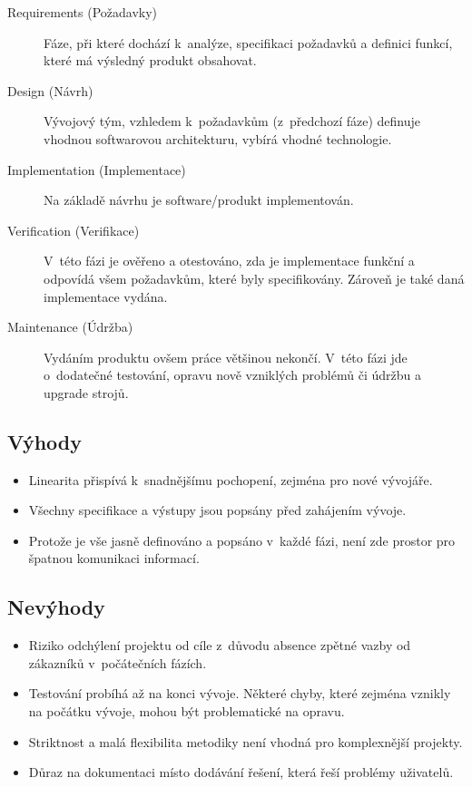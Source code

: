 \documentclass[thesis=M,czech]{FITthesis}[2019/12/23]
\begin{document}
\begin{description}
    \item[Requirements (Požadavky)] Fáze, při které dochází k~analýze, specifikaci požadavků a definici funkcí, které má výsledný produkt obsahovat.
    \item[Design (Návrh)] Vývojový tým, vzhledem k~požadavkům (z~předchozí fáze) definuje vhodnou softwarovou architekturu, vybírá vhodné technologie.
    \item[Implementation (Implementace)] Na základě návrhu je software/produkt implementován.
    \item[Verification (Verifikace)] V~této fázi je ověřeno a otestováno, zda je implementace funkční a odpovídá všem požadavkům, které byly specifikovány. Zároveň je také daná implementace vydána.
    \item[Maintenance (Údržba)] Vydáním produktu ovšem práce většinou nekončí. V~této fázi jde o~dodatečné testování, opravu nově vzniklých problémů či údržbu a upgrade strojů.
\end{description}

\subsection*{Výhody}
\begin{itemize}
    \item Linearita přispívá k~snadnějšímu pochopení, zejména pro nové vývojáře.
    \item Všechny specifikace a výstupy jsou popsány před zahájením vývoje.
    \item Protože je vše jasně definováno a popsáno v~každé fázi, není zde prostor pro špatnou komunikaci informací.
\end{itemize}

\subsection*{Nevýhody}
\begin{itemize}
    \item Riziko odchýlení projektu od cíle z~důvodu absence zpětné vazby od zákazníků v~počátečních fázích.
    \item Testování probíhá až na konci vývoje. Některé chyby, které zejména vznikly na počátku vývoje, mohou být problematické na opravu.
    \item Striktnost a malá flexibilita metodiky není vhodná pro komplexnější projekty.
    \item Důraz na dokumentaci místo dodávání řešení, která řeší problémy uživatelů.
\end{itemize}
\end{document}
